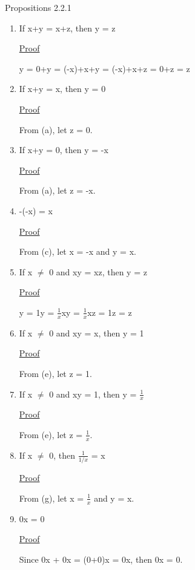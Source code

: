 { \color{blue} Propositions 2.2.1 }
	\begin{enumerate}[label=(\alph*), leftmargin=2cm]
		\item If x+y = x+z, then y = z

			{ \color{magenta} \underline{Proof}  }
		
				y = 0+y = (-x)+x+y = (-x)+x+z = 0+z = z
	
		\item If x+y = x, then y = 0

			{ \color{magenta} \underline{Proof} }

				From (a), let z = 0.
	
		\item If x+y = 0, then y = -x
	
			{ \color{magenta} \underline{Proof} }

				From (a), let z = -x.
	
		\item -(-x) = x

			{ \color{magenta} \underline{Proof} }

				From (c), let x = -x and y = x.
	
		\item If x $\not =$ 0 and xy = xz, then y = z

			{ \color{magenta} \underline{Proof} } 
		
				y = 1y = $\frac{1}{x}$xy = $\frac{1}{x}$xz = 1z = z 
	
		\item If x $\not =$ 0 and xy = x, then y = 1

			{ \color{magenta} \underline{Proof} } 
		
				From (e), let z = 1.
	
		\item If x $\not =$ 0 and xy = 1, then y = $\frac{1}{x}$

			{ \color{magenta} \underline{Proof} } 
		
				From (e), let z = $\frac{1}{x}$.
	
		\item If x $\not =$ 0, then $\frac{1}{1/x}$ = x

			{ \color{magenta} \underline{Proof} } 
		
				From (g), let x = $\frac{1}{x}$ and y = x.
	
		\item 0x = 0

			{ \color{magenta} \underline{Proof} } 
		
				Since 0x + 0x = (0+0)x = 0x, then 0x = 0.
	

\end{enumerate}
